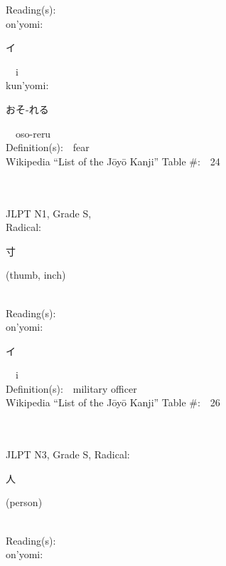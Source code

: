 \begin{multicols}{2}
Reading(s):\ \ \\
{\hspace*{1em}}on'yomi:\ \ \\
{\hspace*{2em}}{\begin{CJK}{UTF8}{min} イ \end{CJK}}\ \ i\ \ \\
{\hspace*{1em}}kun'yomi:\ \ \\
{\hspace*{2em}}{\begin{CJK}{UTF8}{min} おそ-れる \end{CJK}}\ \ oso-reru\ \ \\
Definition(s):\ \ fear \\
Wikipedia ``List of the J\=oy\=o Kanji'' Table \#:\ \ 24 \\
\ \ \\
{\fontsize{34pt}{40pt}  }\ \ \\
{JLPT N1, Grade S, \\Radical:\ \ {\begin{CJK}{UTF8}{min} 寸 \end{CJK}} (thumb, inch) } \\
Reading(s):\ \ \\
{\hspace*{1em}}on'yomi:\ \ \\
{\hspace*{2em}}{\begin{CJK}{UTF8}{min} イ \end{CJK}}\ \ i\ \ \\
Definition(s):\ \ military officer \\
Wikipedia ``List of the J\=oy\=o Kanji'' Table \#:\ \ 26 \\
\ \ \\
{\fontsize{34pt}{40pt}  }\ \ \\  %
{JLPT N3, Grade S, Radical:\ \ {\begin{CJK}{UTF8}{min} 人 \end{CJK}} (person) } \\
Reading(s):\ \ \\
{\hspace*{1em}}on'yomi:\ \ \\

\end{multicols}
